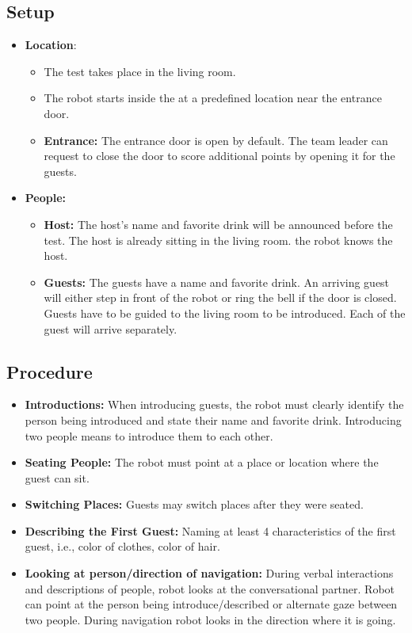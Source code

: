 \subsection*{Setup}
\begin{itemize}
	\item \textbf{Location}: 
	\begin{itemize}
	\item The test takes place in the living room.	
	\item The robot starts inside the \Arena{} at a predefined location near the entrance door.
	\item \textbf{Entrance:} The entrance door is open by default. The team leader can request to close the door to score additional points by opening it for the guests.
	\end{itemize}
	
	\item \textbf{People:} 
	\begin{itemize}
	\item \textbf{Host:} The host's name and favorite drink will be announced before the test. The host is already sitting in the living room. the robot knows the host.

	\item \textbf{Guests:} The guests have a name and favorite drink. An arriving guest will either step in front of the robot or ring the bell if the door is closed. Guests have to be guided to the living room to be introduced. Each of the guest will arrive separately. 
	\end{itemize}

\end{itemize}

\subsection*{Procedure}
\begin{itemize}
    \item \textbf{Introductions:} When introducing guests, the robot must clearly identify the person being introduced and state their name and favorite drink. Introducing two people means to introduce them to each other.
	
	\item \textbf{Seating People:} The robot must point at a place or location where the guest can sit.
	
	\item \textbf{Switching Places:} Guests may switch places after they were seated.
	
	\item \textbf{Describing the First Guest:} Naming at least 4 characteristics of the first guest, i.e., color of clothes, color of hair.
	\item \textbf{Looking at person/direction of navigation:} During verbal interactions and descriptions of people, robot looks at the conversational partner. Robot can point at the person being introduce/described or alternate gaze between two people. During navigation robot looks in the direction where it is going.  
\end{itemize}

